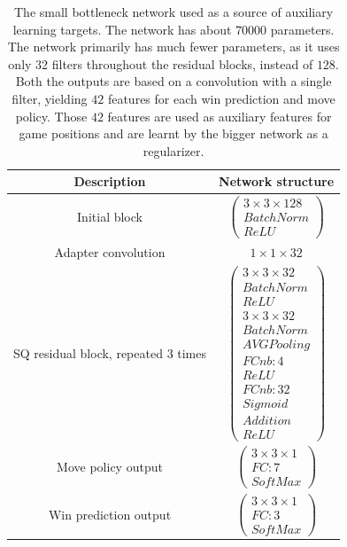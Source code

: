 \documentclass[12pt,onecolumn,oneside,titlepage]{article}
\begin{document}
\begin{table} [H]
 \centering
  \begin{tabular}{c | c }
   Description & Network structure \\
   \hline
   \hline
   Initial block & $\begin{pmatrix} 3 \times 3 \times 128 \\ BatchNorm \\ ReLU \end{pmatrix}$ \\
   \hline
   Adapter convolution & $1 \times 1 \times 32$ \\
   \hline
   SQ residual block, repeated $3$ times & $\begin{pmatrix} 3 \times 3 \times 32 \\ BatchNorm \\ ReLU \\ 3 \times 3 \times 32 \\ BatchNorm \\ AVG Pooling \\ FCnb: 4 \\ ReLU \\ FCnb: 32 \\ Sigmoid \\ Addition \\ ReLU \end{pmatrix}$ \\
   \hline 
   Move policy output & $\begin{pmatrix} 3 \times 3 \times 1 \\ FC: 7 \\ SoftMax \end{pmatrix}$ \\
   \hline
   Win prediction output & $\begin{pmatrix} 3 \times 3 \times 1 \\ FC: 3 \\ SoftMax \end{pmatrix}$
  \end{tabular}
  \caption{The small bottleneck network used as a source of auxiliary learning targets. The network has about $70000$ parameters.
  The network primarily has much fewer parameters, as it uses only $32$ filters throughout the residual blocks, instead of $128$. 
  Both the outputs are based on a convolution with a single filter, yielding $42$ features for each win prediction and move policy. Those $42$
  features are used as auxiliary features for game positions and are learnt by the bigger network as a regularizer.}
  \label{fig:sq_bottleneck_network}
\end{table}
\end{document}
